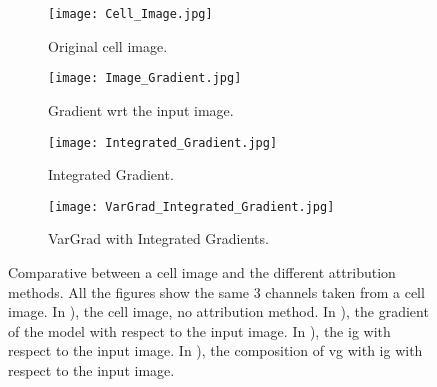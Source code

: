 \begin{figure}[!ht]
  \centering
  \begin{subfigure}[b]{.45\linewidth}
    \texttt{[image: Cell\_Image.jpg]}
    \caption{Original cell image.}
    \label{fig:vg:cell_img}
  \end{subfigure}
  \begin{subfigure}[b]{.45\linewidth}
    \texttt{[image: Image\_Gradient.jpg]}
    \caption{Gradient wrt the input image.}
    \label{fig:vg:img_gradients}
  \end{subfigure}%
  \vspace{3mm}
  \begin{subfigure}[b]{.45\linewidth}
    \texttt{[image: Integrated\_Gradient.jpg]}
    \caption{Integrated Gradient.}
    \label{fig:vg:img_IG}
  \end{subfigure}
  \begin{subfigure}[b]{.45\linewidth}
    \texttt{[image: VarGrad\_Integrated\_Gradient.jpg]}
    \caption{VarGrad with Integrated Gradients.}
    \label{fig:vg:img_VG_IG}
  \end{subfigure}
  \caption{Comparative between a cell image and the different attribution methods. All the figures show the same 3 channels taken from a cell image. In ), the cell image, no attribution method. In ), the gradient of the model with respect to the input image. In ), the \gls{ig} with respect to the input image. In ), the composition of \gls{vg} with \gls{ig} with respect to the input image.}
  \label{fig:vg:comparative}
\end{figure}
